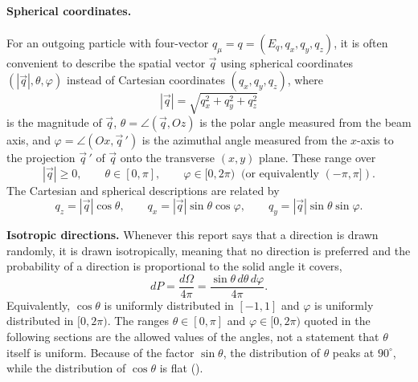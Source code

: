 \documentclass{article}
\begin{document}
\paragraph{Spherical coordinates.} For an outgoing particle with four-vector $q_\mu = q = (E_q, q_x, q_y, q_z)$, it is often convenient to describe the spatial vector $\vec{q}$ using spherical coordinates $(|\vec{q}|, \theta, \varphi)$ instead of Cartesian coordinates $(q_x, q_y, q_z)$, where
\begin{equation}
    |\vec{q}| = \sqrt{q_x^2 + q_y^2 + q_z^2}
\end{equation}
is the magnitude of $\vec{q}$, $\theta = \angle(\vec{q}, Oz)$ is the polar angle measured from the beam axis, and $\varphi = \angle(Ox, \vec{q}\,')$ is the azimuthal angle measured from the $x$-axis to the projection $\vec{q}\,'$ of $\vec{q}$ onto the transverse $(x,y)$ plane. These range over
\begin{equation}
    |\vec{q}| \geq 0, \qquad \theta \in [0, \pi], \qquad \varphi \in [0, 2\pi) \;\; (\text{or equivalently } (-\pi, \pi]).
\end{equation}
The Cartesian and spherical descriptions are related by
\begin{equation}
    q_z = |\vec{q}|\cos\theta, \qquad q_x = |\vec{q}|\sin\theta\cos\varphi, \qquad q_y = |\vec{q}|\sin\theta\sin\varphi.
\end{equation}
\par\textbf{Isotropic directions.}\label{para:isotropic}
Whenever this report says that a direction is drawn randomly, it is drawn isotropically, meaning that no direction is preferred and the probability of a direction is proportional to the solid angle it covers,
\begin{equation}
    dP = \frac{d\Omega}{4\pi} = \frac{\sin\theta\,d\theta\,d\varphi}{4\pi}.
\end{equation}
Equivalently, $\cos\theta$ is uniformly distributed in $[-1,1]$ and $\varphi$ is uniformly distributed in $[0,2\pi)$. The ranges $\theta\in[0,\pi]$ and $\varphi\in[0,2\pi)$ quoted in the following sections are the allowed values of the angles, not a statement that $\theta$ itself is uniform. Because of the factor $\sin\theta$, the distribution of $\theta$ peaks at $90^\circ$, while the distribution of $\cos\theta$ is flat ().
\end{document}
